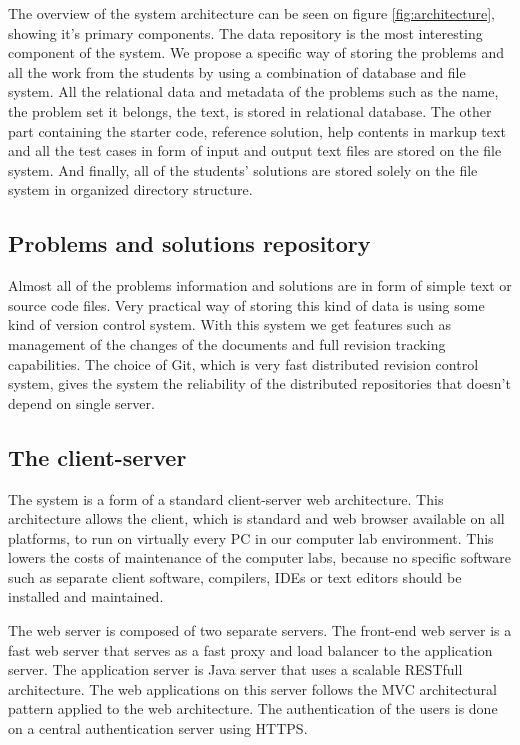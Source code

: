 \documentclass{article}
\begin{document}
The overview of the system architecture can be seen on figure
\ref{fig:architecture}, showing it's primary components. The data repository
is the most interesting component of the system. We propose a specific way of
storing the problems and all the work from the students by using a combination
of database and file system. All the relational data and metadata of the
problems such as the name, the problem set it belongs, the text, is stored in
relational database. The other part containing the starter code, reference
solution, help contents in markup text and all the test cases in form of
input and output text files are stored on the file system. And finally, all of
the students' solutions are stored solely on the file system in organized
directory structure.

\subsection{Problems and solutions repository}
Almost all of the problems information and solutions are in form of simple text
or source code files. Very practical way of storing this kind of data is using
some kind of version control system. With this system we get features such as
management of the changes of the documents and full revision tracking
capabilities. The choice of Git, which is very fast distributed revision control
system, gives the system the reliability of the distributed repositories that
doesn't depend on single server.

\subsection{The client-server}

The system is a form of a standard client-server web architecture. This
architecture allows the client, which is standard and web browser available on
all platforms, to run on virtually every PC in our computer lab environment.
This lowers the costs of maintenance of the computer labs, because no specific
software such as separate client software, compilers, IDEs or text editors
should be installed and maintained.

The web server is composed of two separate servers. The front-end web server is
a fast web server that serves as a fast proxy and load balancer to the
application server. The application server is Java server that uses a scalable
RESTfull architecture. The web applications on this server follows the MVC
architectural pattern applied to the web architecture. The authentication of the
users is done on a central authentication server using HTTPS. 
\end{document}
